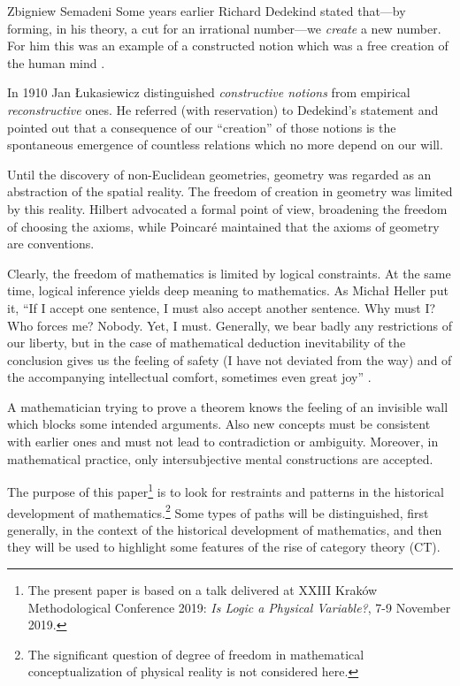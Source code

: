 \begin{artengenv}{Zbigniew Semadeni}
Some years earlier Richard Dedekind stated that---by forming, in his theory, a cut 
for an irrational number---we \textit{create} a new number. For him this was an example 
of a constructed notion which was a free creation of the human mind \parencite[\S~4]{Stetigkeit}. 

In 1910 Jan Łukasiewicz distinguished \textit{constructive notions} from empirical 
\textit{reconstructive} ones. He referred (with reservation) to Dedekind’s statement 
and pointed out that a consequence of our ``creation'' of those notions is the 
 spontaneous emergence of countless relations which no more depend on our will. 

Until the discovery of non-Euclidean geometries, geometry was regarded as an 
abstraction of the spatial reality. The freedom of creation in geometry was 
limited by this reality. Hilbert advocated a formal point of view, broadening the 
freedom of choosing the axioms, while Poincar\'e maintained that the axioms of 
geometry are conventions.
 
Clearly, the freedom of mathematics is limited by logical constraints. At the same 
time, logical inference yields deep meaning to mathematics. As Michał Heller put it, 
``If I accept one sentence, I must also accept another sentence. Why must I? 
Who forces me? 
Nobody. Yet, I must. Generally, we bear badly any restrictions of our liberty, but 
in the case of mathematical deduction inevitability of the conclusion gives us the 
feeling of safety (I have not deviated from the way) and of the accompanying 
intellectual comfort, sometimes even great joy'' \parencite[p.21]{Heller}. 

A mathematician trying to prove a theorem knows the feeling of an invisible wall 
which blocks some intended arguments. Also new concepts must be consistent with 
earlier ones and must not lead to contradiction or ambiguity. Moreover, in 
mathematical practice, only intersubjective mental constructions are accepted.  

The purpose of this paper\footnote{The present paper is based on a talk delivered 
at XXIII Kraków Methodological Conference 2019: {\it Is Logic a Physical Variable?}, 
7-9 November 2019.} %
is to look for restraints and patterns in the historical development of 
mathematics.\footnote{ The significant question of degree of freedom in mathematical 
conceptualization of physical reality is not considered here.}  %
Some types of paths will be distinguished, first generally, in the context of 
the historical development of mathematics, and then they will be used to highlight 
some features of the rise of category theory (CT). 


\end{artengenv}
